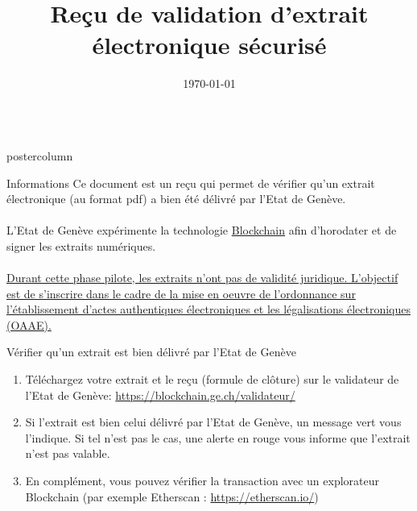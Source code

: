 \documentclass[roundedcorners=true, titleposition=center]{beamerthemeruhuisstijlposter}
\title{Reçu de validation d’extrait électronique sécurisé}
\date{\today}
\begin{document}
\begin{frame}
\begin{columns}
\begin{column}{0.95\textwidth}
\begin{beamercolorbox}[center, wd=\textwidth]{postercolumn}
\begin{minipage}[T]{0.95\textwidth}
\parbox[t][\columnheight]{\textwidth}{%
  \begin{block}{Informations}
  	Ce document est un reçu qui permet de vérifier qu'un extrait électronique (au format pdf) a bien été délivré par l’Etat de Genève.
   \\
   \\
	L'Etat de Genève expérimente la technologie \href{https://demain.ge.ch/blog/geneve-lab/blockchain-presentee-discutee-lors-cafe-republique-numerique-22-03-2017}{Blockchain} afin d'horodater et de signer les extraits numériques.
\\
\\
	\ul{Durant cette phase pilote, les extraits n’ont pas de validité juridique.
L’objectif est de s’inscrire dans le cadre de la mise en oeuvre de l’ordonnance sur l’établissement d’actes authentiques électroniques et les légalisations électroniques (OAAE).}
  \end{block}
\medskip
\begin{block}{Vérifier qu'un extrait est bien délivré par l’Etat de Genève} 
\end{block}
\begin{enumerate}
\item Téléchargez votre extrait et le reçu (formule de clôture) sur le validateur de l’Etat de Genève: \url{https://blockchain.ge.ch/validateur/}
\item Si l’extrait est bien celui délivré par l’Etat de Genève, un message vert vous l’indique. Si tel n’est pas le cas, une alerte en rouge vous informe que l’extrait n’est pas valable.
\item  En complément, vous pouvez vérifier la transaction avec un explorateur Blockchain (par exemple  Etherscan : \url{https://etherscan.io/})
\end{enumerate}
}
\end{minipage}
\end{beamercolorbox}
\end{column}
\end{columns}
\end{frame}
\end{document}
